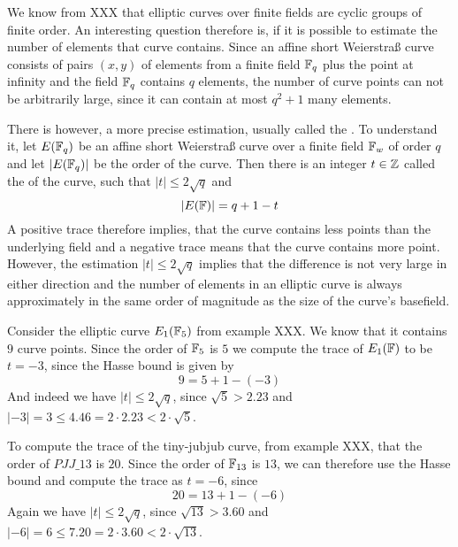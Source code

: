 We know from XXX that elliptic curves over finite fields are cyclic groups of finite order. An interesting question therefore is, if it is possible to estimate the number of elements that curve contains. Since an affine short Weierstraß curve consists of pairs $(x,y)$ of elements from a finite field $\mathbb{F}_q$ plus the point at infinity and the field $\mathbb{F}_q$ contains $q$ elements, the number of curve points can not be arbitrarily large, since it can contain at most $q^2+1$ many elements. 

There is however, a more precise estimation, usually called the . To understand it, let $E(\mathbb{F}_q)$ be an affine short Weierstraß curve over a finite field $\mathbb{F}_w$ of order $q$ and let $|E(\mathbb{F}_q)|$ be the order of the curve. Then there is an integer $t\in \mathbb{Z}$ called the  of the curve, such that $|t| \leq 2\sqrt{q}$ and
\begin{equation}
|E(\mathbb{F})| = q +1 -t
\end{equation}
A positive trace therefore implies, that the curve contains less points than the underlying field and a negative trace means that the curve contains more point. However, the estimation $|t| \leq 2\sqrt{q}$ implies that the difference is not very large in either direction and the number of elements in an elliptic curve is always approximately in the same order of magnitude as the size of the curve's basefield.
\begin{example} Consider the elliptic curve $E_1(\mathbb{F}_5)$ from example XXX. We know that it contains $9$ curve points. Since the order of $\mathbb{F}_5$ is $5$ we compute the trace of $E_1(\mathbb{F})$ to be $t=-3$, since the Hasse bound is given by
$$
9 = 5 + 1 - (-3)
$$
And indeed we have $|t| \leq 2\sqrt{q}$, since $\sqrt{5}> 2.23$ and 
$|-3|= 3 \leq 4.46 = 2\cdot 2.23< 2\cdot \sqrt{5}$.
\end{example}
\begin{example} To compute the trace of the tiny-jubjub curve,  from example XXX, that the order of $\mathit{PJJ\_13}$ is $20$. Since the order of $\mathbb{F}_{13}$ is $13$, we can therefore use the Hasse bound and compute the trace as $t=-6$, since
$$
20 = 13 + 1 - (-6)
$$
Again we have $|t| \leq 2\sqrt{q}$, since $\sqrt{13}> 3.60$ and 
$|-6|= 6 \leq 7.20 = 2\cdot 3.60< 2\cdot \sqrt{13}$.
\end{example}
